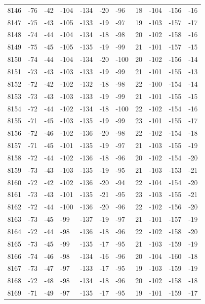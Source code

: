 \begin{table}[H]
\begin{tabular}{lllllllllll}
8146 & -76 & -42 & -104 & -134 & -20 & -96 & 18 & -104 & -156 & -16 \\
8147 & -75 & -43 & -105 & -133 & -19 & -97 & 19 & -103 & -157 & -17 \\
8148 & -74 & -44 & -104 & -134 & -18 & -98 & 20 & -102 & -158 & -16 \\
8149 & -75 & -45 & -105 & -135 & -19 & -99 & 21 & -101 & -157 & -15 \\
8150 & -74 & -44 & -104 & -134 & -20 & -100 & 20 & -102 & -156 & -14 \\
8151 & -73 & -43 & -103 & -133 & -19 & -99 & 21 & -101 & -155 & -13 \\
8152 & -72 & -42 & -102 & -132 & -18 & -98 & 22 & -100 & -154 & -14 \\
8153 & -73 & -43 & -103 & -133 & -19 & -99 & 21 & -101 & -155 & -15 \\
8154 & -72 & -44 & -102 & -134 & -18 & -100 & 22 & -102 & -154 & -16 \\
8155 & -71 & -45 & -103 & -135 & -19 & -99 & 23 & -101 & -155 & -17 \\
8156 & -72 & -46 & -102 & -136 & -20 & -98 & 22 & -102 & -154 & -18 \\
8157 & -71 & -45 & -101 & -135 & -19 & -97 & 21 & -103 & -155 & -19 \\
8158 & -72 & -44 & -102 & -136 & -18 & -96 & 20 & -102 & -154 & -20 \\
8159 & -73 & -43 & -103 & -135 & -19 & -95 & 21 & -103 & -153 & -21 \\
8160 & -72 & -42 & -102 & -136 & -20 & -94 & 22 & -104 & -154 & -20 \\
8161 & -73 & -43 & -101 & -135 & -21 & -95 & 23 & -103 & -155 & -21 \\
8162 & -72 & -44 & -100 & -136 & -20 & -96 & 22 & -102 & -156 & -20 \\
8163 & -73 & -45 & -99 & -137 & -19 & -97 & 21 & -101 & -157 & -19 \\
8164 & -72 & -44 & -98 & -136 & -18 & -96 & 22 & -102 & -158 & -20 \\
8165 & -73 & -45 & -99 & -135 & -17 & -95 & 21 & -103 & -159 & -19 \\
8166 & -74 & -46 & -98 & -134 & -16 & -96 & 20 & -104 & -160 & -18 \\
8167 & -73 & -47 & -97 & -133 & -17 & -95 & 19 & -103 & -159 & -19 \\
8168 & -72 & -48 & -98 & -134 & -18 & -96 & 20 & -102 & -158 & -18 \\
8169 & -71 & -49 & -97 & -135 & -17 & -95 & 19 & -101 & -159 & -17 \\

\end{tabular}
\end{table}
